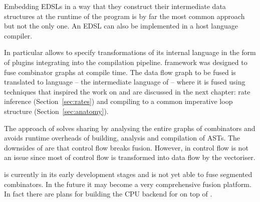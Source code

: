 \documentclass[preamble.tex]{subfiles}
\begin{document}
Embedding EDSLs in a way that they construct their intermediate data structures at the runtime of the program is by far the most common approach but not the only one. An EDSL can also be implemented in a host language compiler.

In particular \GHC allows to specify transformations of its internal  language in the form of plugins integrating into the compilation pipeline. \FlowFusion framework \cite{FlowFusion, FusingFiltersILP} was designed to fuse combinator graphs at compile time. The data flow graph to be fused is translated to  language -- the intermediate language of  \cite{DDC} -- where it is fused using  techniques that inspired the work on \LiveFusion and are discussed in the next chapter: rate inference (Section~\ref{sec:rates}) and compiling to a common imperative loop structure (Section~\ref{sec:anatomy}).

The approach of \FlowFusion solves sharing by analysing the entire graphs of combinators and avoids runtime overheads of building, analysis and compilation of ASTs. The downsides of \FlowFusion are that control flow breaks fusion. However, in \DPH control flow is not an issue since most of control flow is transformed into data flow by the vectoriser.

\FlowFusion is currently in its early development stages and is not yet able to fuse segmented combinators. In the future it may become a very comprehensive fusion platform. In fact there are plans for building the CPU backend for \Accelerate on top of \FlowFusion.
\end{document}
